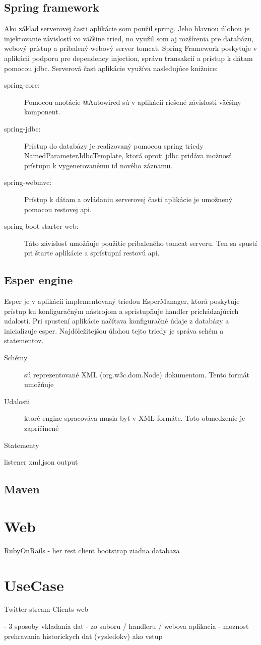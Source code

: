	\subsection{Spring framework}
		Ako základ serverovej časti aplikácie som použil spring. Jeho hlavnou úlohou je injektovanie závislostí vo väčšine tried, no využil som aj rozšírenia pre databázu, webový prístup a pribalený webový server tomcat.
		Spring Framework poskytuje v aplikácii podporu pre dependency injection, správu transakcií a prístup k dátam pomocou jdbc. Serverová časť aplikácie využíva nasledujúce knižnice:
		\begin{description}
			\item[spring-core:] Pomocou anotácie @Autowired sú v aplikácii riešené závislosti väčšiny komponent.
			\item[spring-jdbc:] Prístup do databázy je realizovaný pomocou spring triedy NamedParameterJdbcTemplate, ktorá oproti jdbc pridáva možnosť prístupu k vygenerovanému id nového záznamu.
			\item[spring-webmvc:] Prístup k dátam a ovládaniu serverovej časti aplikácie je umožnený pomocou restovej api.
			\item[spring-boot-starter-web:] Táto závislosť umožňuje použitie pribaleného tomcat serveru. Ten sa spustí pri štarte aplikácie a sprístupní restovú api.
		\end{description}

	\subsection{Esper engine}
		Esper je v aplikácii implementovaný triedou EsperManager, ktorá poskytuje prístup ku konfiguračným nástrojom a sprístupňuje handler prichádzajúcich udalostí. Pri spustení aplikácie načítava konfiguračné údaje z databázy a inicializuje esper. Najdôležitejšou úlohou tejto triedy je správa schém a statementov.
		\begin{description}
			\item[Schémy] sú reprezentované XML (org.w3c.dom.Node) dokumentom. Tento formát umožňuje 
			\item[Udalosti] ktoré engine spracováva musia byť v XML formáte. Toto obmedzenie je zapríčinené 
			\item[Statementy] 
		\end{description}
		
		listener
		xml,json output
	\subsection{Maven}
		

\section{Web}
	RubyOnRails - her rest client
	bootstrap
	ziadna databaza
	
\section{UseCase}
		Twitter stream
		Clients web

- 3 sposoby vkladania dat - zo suboru / handleru / webova aplikacia
- moznost prehravania historickych dat (vysledokv) ako vstup